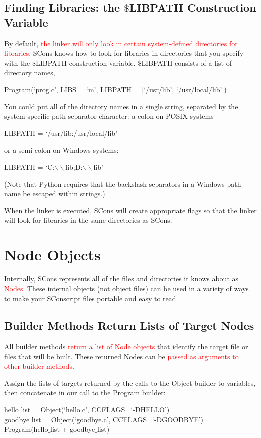 \documentclass[12pt,a4paper]{article}
\begin{document}
\subsection{Finding Libraries: the $\$$LIBPATH Construction Variable}
By default, \textcolor{red}{the linker will only look in certain system-defined directories for libraries}. SCons knows how to look for libraries in directories that you specify with the $\$$LIBPATH construction variable. $\$$LIBPATH consists of a list of directory names,

Program(`prog.c', LIBS = `m',
                  LIBPATH = [`/usr/lib', `/usr/local/lib'])

You could put all of the directory names in a single string, separated by the system-specific path separator character: a colon on POSIX systems

LIBPATH = `/usr/lib:/usr/local/lib'

or a semi-colon on Windows systems:

LIBPATH = `C:$\backslash\backslash$lib;D:$\backslash\backslash$lib'

(Note that Python requires that the backslash separators in a Windows path name be escaped within strings.)

When the linker is executed, SCons will create appropriate flags so that the linker will look for libraries in the same directories as SCons.


\section{Node Objects}
Internally, SCons represents all of the files and directories it knows about as \textcolor{red}{Nodes}. These internal objects (not object files) can be used in a variety of ways to make your SConscript files portable and easy to read.

\subsection{Builder Methods Return Lists of Target Nodes}
All builder methods \textcolor{red}{return a list of Node objects} that identify the target file or files that will be built. These returned Nodes can be \textcolor{red}{passed as arguments to other builder methods}.

Assign the lists of targets returned by the calls to the Object builder to variables, then concatenate in our call to the Program builder:

hello$\_$list = Object(`hello.c', CCFLAGS=`-DHELLO') \\
goodbye$\_$list = Object(`goodbye.c', CCFLAGS=`-DGOODBYE') \\
Program(hello$\_$list + goodbye$\_$list)
\end{document}

